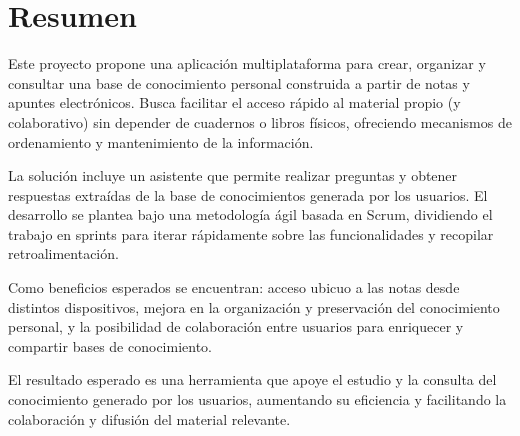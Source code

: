 \chapter*{Resumen}
\thispagestyle{fancy}

Este proyecto propone una aplicación multiplataforma para crear, organizar y consultar una base de conocimiento personal construida a partir de notas y apuntes electrónicos. Busca facilitar el acceso rápido al material propio (y colaborativo) sin depender de cuadernos o libros físicos, ofreciendo mecanismos de ordenamiento y mantenimiento de la información.

La solución incluye un asistente que permite realizar preguntas y obtener respuestas extraídas de la base de conocimientos generada por los usuarios. El desarrollo se plantea bajo una metodología ágil basada en Scrum, dividiendo el trabajo en sprints para iterar rápidamente sobre las funcionalidades y recopilar retroalimentación.

Como beneficios esperados se encuentran: acceso ubicuo a las notas desde distintos dispositivos, mejora en la organización y preservación del conocimiento personal, y la posibilidad de colaboración entre usuarios para enriquecer y compartir bases de conocimiento.

El resultado esperado es una herramienta que apoye el estudio y la consulta del conocimiento generado por los usuarios, aumentando su eficiencia y facilitando la colaboración y difusión del material relevante.
